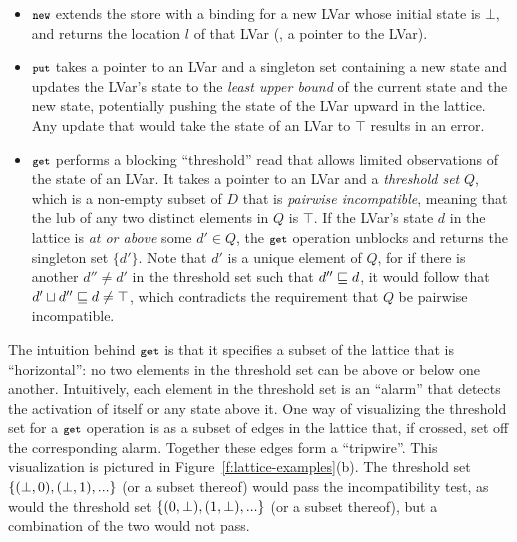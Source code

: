 \begin{itemize}
\item $\mbox{\footnotesize \texttt{new}}$ extends the store with a binding for a new LVar whose
  initial state is $\bot$, and returns the location $l$ of that LVar
  (\ie, a pointer to the LVar).
\item $\mbox{\footnotesize \texttt{put}}$ takes a pointer to an LVar and a singleton set containing
  a new state and updates the LVar's state to the {\em least upper bound} of the current state and the new state,
  potentially pushing the state of the LVar upward in the
  lattice.  Any update that would take the state of an LVar to $\top$
  results in an error.
\item $\mbox{\footnotesize \texttt{get}}$ performs a blocking ``threshold'' read that allows
  limited observations of the state of an LVar.  It takes a pointer to
  an LVar and a \emph{threshold set} $Q$, which is a non-empty subset
  of $D$ that is \emph{pairwise incompatible}, meaning that the lub of
  any two distinct elements in $Q$ is $\top$.  If the LVar's state $d$
  in the lattice is {\em at or above} some $d' \in Q$, the $\mbox{\footnotesize \texttt{get}}$
  operation unblocks and returns the singleton set $\lbrace d'
  \rbrace$.  Note that $d'$ is a unique element of $Q$, for if there
  is another $d'' \neq d'$ in the threshold set such that $d'' \sqsubseteq
  d$, it would follow that $d' \sqcup d'' \sqsubseteq d \neq \top$, which
  contradicts the requirement that $Q$ be pairwise incompatible.
\end{itemize}

\noindent The intuition behind $\mbox{\footnotesize \texttt{get}}$ is that
it specifies a subset of the lattice that is ``horizontal'': no two
elements in the threshold set can be above or below one another.  
Intuitively, each element in the threshold set is an
``alarm'' that detects the activation of itself or any state
above it.  One way of visualizing the threshold set for a $\mbox{\footnotesize \texttt{get}}$ operation
is as a subset of edges in the lattice that, if crossed, set off the
corresponding alarm.  Together these edges form a ``tripwire''.  This
visualization is pictured in Figure~\ref{f:lattice-examples}(b).  The
threshold set $\lbrace (\bot, 0), (\bot, 1), ... \rbrace$ (or a subset thereof)
would pass the incompatibility test, as would the threshold set
$\lbrace (0, \bot), (1, \bot), ... \rbrace$ (or a subset thereof), but a
combination of the two would not pass.


